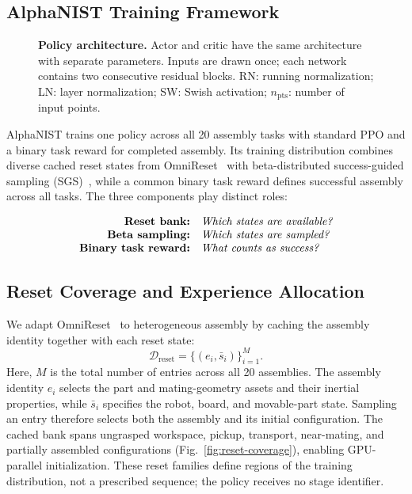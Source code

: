 \subsection{AlphaNIST Training Framework}

\begin{figure}[t]
    \centering
    \resizebox{\textwidth}{!}{}
    \caption{\textbf{Policy architecture.} 
    Actor and critic have the same architecture with separate
    parameters. Inputs are drawn once; each network contains two consecutive
    residual blocks. RN: running normalization; LN: layer normalization;
    SW: Swish activation; $n_{\mathrm{pts}}$: number of input points.}
    \label{fig:policy-architecture}
\end{figure}



AlphaNIST trains one policy across all 20 assembly tasks with standard PPO
and a binary task reward for completed assembly.
Its training distribution combines diverse cached
reset states from OmniReset~\cite{yin2026omnireset} with beta-distributed success-guided sampling (SGS)~\cite{zhang2026balanceddiet}, while a common binary task
reward defines successful assembly across all tasks. The three components
play distinct roles:


\[
\begin{array}{r@{\quad}l}
\textbf{Reset bank:}    & \textit{Which states are available?}\\
\textbf{Beta sampling:} & \textit{Which states are sampled?}\\
\textbf{Binary task reward:} & \textit{What counts as success?}
\end{array}
\]




\subsection{Reset Coverage and Experience Allocation}
\label{sec:success_guided_sampling}


We adapt OmniReset~\cite{yin2026omnireset} to heterogeneous assembly by
caching the assembly identity together with each reset state:
\begin{equation}
    \mathcal{D}_{\mathrm{reset}}
    =\{(e_i,\bar{s}_i)\}_{i=1}^{M}.
\end{equation}
Here, $M$ is the total number of entries across all 20 assemblies.
The assembly identity $e_i$ selects the part and mating-geometry assets and their inertial properties, while $\bar{s}_i$ specifies the robot,
board, and movable-part state. Sampling an entry therefore selects
both the assembly and its initial configuration.
The cached bank spans ungrasped
workspace, pickup, transport, near-mating, and partially assembled
configurations (Fig.~\ref{fig:reset-coverage}), enabling GPU-parallel
initialization. These reset families
define regions of the training distribution, not a prescribed sequence; the
policy receives no stage identifier.

